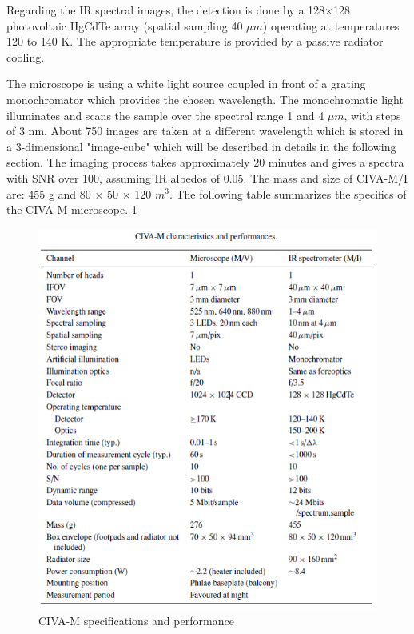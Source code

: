 Regarding the IR spectral images, the detection is done by a 128×128 photovoltaic HgCdTe array (spatial sampling 40 $\mu m$) operating at temperatures 120 to 140 K. The appropriate temperature is provided by a passive radiator cooling. 

The microscope is using a white light source coupled in front of a grating monochromator which provides the chosen wavelength. The monochromatic light illuminates and scans the sample over the spectral range 1 and 4 $\mu m$, with steps of 3 nm. About 750 images are taken at a different wavelength which is stored in a 3-dimensional "image-cube" which will be described in details in the following section. The imaging process takes approximately 20 minutes and gives a spectra with SNR over 100, assuming IR albedos of 0.05. The mass and size of CIVA-M/I are: 455 g and 80 × 50 × 120 $m^3$.
The following table summarizes the specifics of the CIVA-M microscope. 
\ref{fig:CIVAM_specs}

\begin{figure}[htb]
  \centering
  \includegraphics[scale=0.7]{figures/BFfig/CIVAM_specs}
  \caption{CIVA-M specifications and performance}
  \label{fig:CIVAM_specs}
\end{figure}



